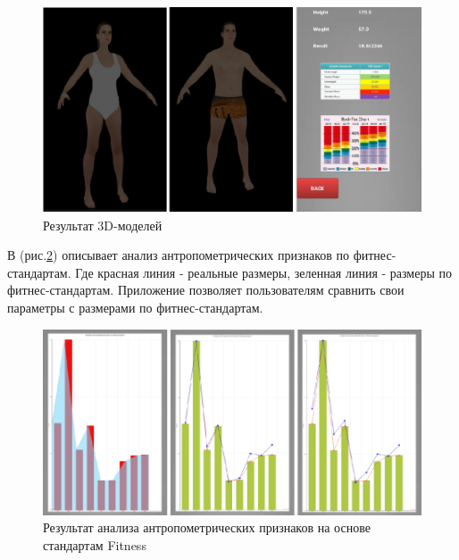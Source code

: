 \begin{figure}[ht!]
\centering
\includegraphics [scale=0.5] {images/h40.png}
\begin{center}
\caption{Результат 3D-моделей} \label{img40}
\end{center}
\end{figure}
В (рис.\ref{img41}) описывает анализ антропометрических признаков по фитнес-стандартам. Где красная линия - реальные размеры, зеленная линия - размеры по фитнес-стандартам. Приложение позволяет пользователям сравнить свои параметры с размерами по фитнес-стандартам.  
\begin{figure}[ht!]
\centering
\includegraphics [scale=0.5] {images/h41.png}
\begin{center}
\caption{Результат анализа антропометрических признаков на основе стандартам Fitness} \label{img41}
\end{center}
\end{figure}